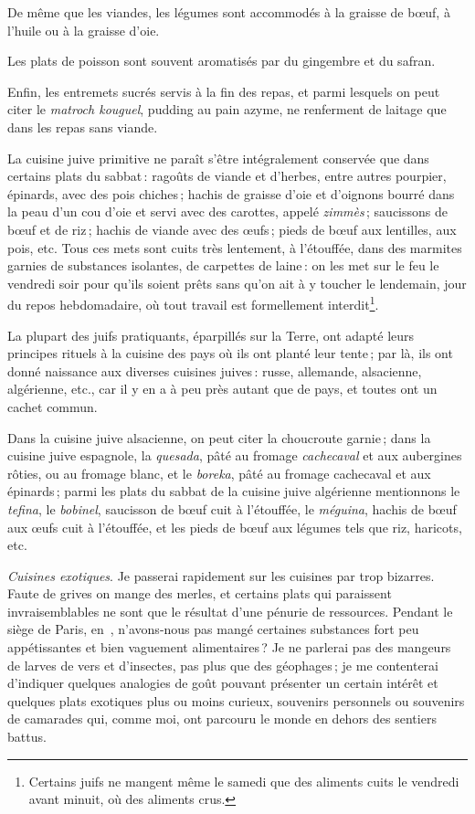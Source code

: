De même que les viandes, les légumes sont accommodés à la graisse de bœuf,
à l'huile ou à la graisse d'oie.

Les plats de poisson sont souvent aromatisés par du gingembre et du safran.

Enfin, les entremets sucrés servis à la fin des repas, et parmi lesquels on
peut citer le \textit{matroch kouguel}, pudding au pain azyme, ne renferment de
laitage que dans les repas sans viande.

La cuisine juive primitive ne paraît s'être intégralement conservée que dans
certains plats du sabbat : ragoûts de viande et d'herbes, entre autres
pourpier, épinards, avec des pois chiches ; hachis de graisse d'oie et
d'oignons bourré dans la peau d'un cou d'oie et servi avec des carottes, appelé
\textit{zimmès} ; saucissons de bœuf et de riz ; hachis de viande avec des
œufs ; pieds de bœuf aux lentilles, aux pois, etc. Tous ces mets sont cuits
très lentement, à l'étouffée, dans des marmites garnies de substances
isolantes, de carpettes de laine : on les met sur le feu le vendredi soir pour
qu'ils soient prêts sans qu'on ait à y toucher le lendemain, jour du repos
hebdomadaire, où tout travail est formellement interdit\footnote{Certains juifs
ne mangent même le samedi que des aliments cuits le vendredi avant minuit, où
des aliments crus.}.

La plupart des juifs pratiquants, éparpillés sur la Terre, ont adapté leurs
principes rituels à la cuisine des pays où ils ont planté leur tente ; par là,
ils ont donné naissance aux diverses cuisines juives : russe, allemande,
alsacienne, algérienne, etc., car il y en a à peu près autant que de pays, et
toutes ont un cachet commun.

Dans la cuisine juive alsacienne, on peut citer la choucroute garnie ; dans la
cuisine juive espagnole, la \textit{quesada}, pâté au fromage
\textit{cachecaval} et aux aubergines rôties, ou au fromage blanc, et le
\textit{boreka}, pâté au fromage cachecaval et aux épinards ; parmi les plats
du sabbat de la cuisine juive algérienne mentionnons le \textit{tefina}, le
\textit{bobinel}, saucisson de bœuf cuit à l'étouffée, le \textit{méguina},
hachis de bœuf aux œufs cuit à l'étouffée, et les pieds de bœuf aux légumes
tels que riz, haricots, etc.

\sk

 \textit{Cuisines exotiques}. Je passerai rapidement
sur les cuisines par trop bizarres. Faute de grives on mange des merles, et
certains plats qui paraissent invraisemblables ne sont que le résultat d'une
pénurie de ressources. Pendant le siège de Paris, en {\mmm} {\mmm},
n'avons-nous pas mangé certaines substances fort peu appétissantes et bien
vaguement alimentaires ? Je ne parlerai pas des mangeurs de larves de vers et
d'insectes, pas plus que des géophages ; je me contenterai d'indiquer quelques
analogies de goût pouvant présenter un certain intérêt et quelques plats
exotiques plus ou moins curieux, souvenirs personnels ou souvenirs de camarades
qui, comme moi, ont parcouru le monde en dehors des sentiers battus.

